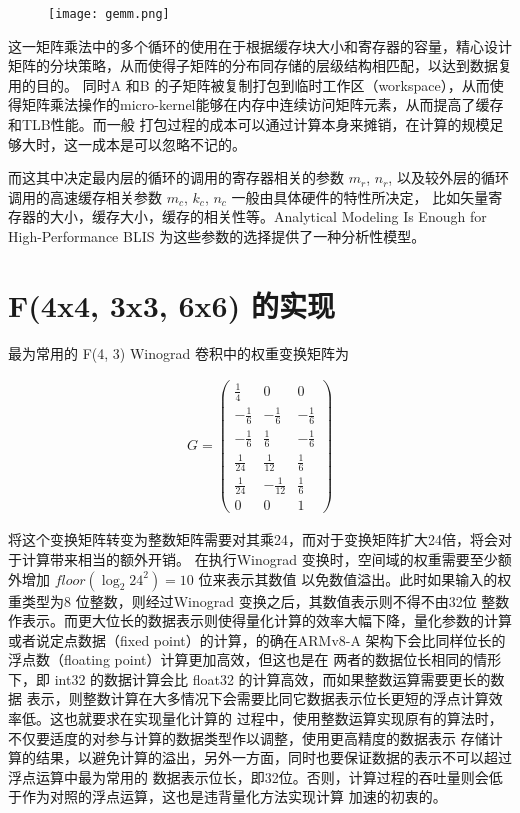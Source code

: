 \begin{figure}
  \texttt{[image: gemm.png]}
\end{figure}

这一矩阵乘法中的多个循环的使用在于根据缓存块大小和寄存器的容量，精心设计矩阵的分块策略，从而使得子矩阵的分布同存储的层级结构相匹配，以达到数据复用的目的。
同时A 和B 的子矩阵被复制打包到临时工作区（workspace），从而使得矩阵乘法操作的micro-kernel能够在内存中连续访问矩阵元素，从而提高了缓存和TLB性能。而一般
打包过程的成本可以通过计算本身来摊销，在计算的规模足够大时，这一成本是可以忽略不记的。

而这其中决定最内层的循环的调用的寄存器相关的参数 $m_r$, $n_r$, 以及较外层的循环调用的高速缓存相关参数 $m_c$, $k_c$, $n_c$ 一般由具体硬件的特性所决定，
比如矢量寄存器的大小，缓存大小，缓存的相关性等。Analytical Modeling Is Enough for High-Performance BLIS 为这些参数的选择提供了一种分析性模型。



\iffalse
\section{F(4x4, 3x3, 6x6) 的实现}

最为常用的 F(4, 3) Winograd 卷积中的权重变换矩阵为

\begin{align}
\label{eq:winograd_f43}
  G = 
  \begin{pmatrix}
    \frac{1}{4} & 0 & 0 \\
    -\frac{1}{6} & -\frac{1}{6} & -\frac{1}{6} \\
    -\frac{1}{6} & \frac{1}{6} & -\frac{1}{6} \\
    \frac{1}{24} & \frac{1}{12} & \frac{1}{6} \\
    \frac{1}{24} & -\frac{1}{12} & \frac{1}{6} \\
    0 & 0 & 1
  \end{pmatrix}
\end{align}

将这个变换矩阵转变为整数矩阵需要对其乘24，而对于变换矩阵扩大24倍，将会对于计算带来相当的额外开销。
在执行Winograd 变换时，空间域的权重需要至少额外增加 $floor(\log_{2}{24^2}) = 10$ 位来表示其数值
以免数值溢出。此时如果输入的权重类型为8 位整数，则经过Winograd 变换之后，其数值表示则不得不由32位
整数作表示。而更大位长的数据表示则使得量化计算的效率大幅下降，量化参数的计算或者说定点数据（fixed 
point）的计算，的确在ARMv8-A 架构下会比同样位长的浮点数（floating point）计算更加高效，但这也是在
两者的数据位长相同的情形下，即 int32 的数据计算会比 float32 的计算高效，而如果整数运算需要更长的数据
表示，则整数计算在大多情况下会需要比同它数据表示位长更短的浮点计算效率低。这也就要求在实现量化计算的
过程中，使用整数运算实现原有的算法时，不仅要适度的对参与计算的数据类型作以调整，使用更高精度的数据表示
存储计算的结果，以避免计算的溢出，另外一方面，同时也要保证数据的表示不可以超过浮点运算中最为常用的
数据表示位长，即32位。否则，计算过程的吞吐量则会低于作为对照的浮点运算，这也是违背量化方法实现计算
加速的初衷的。

